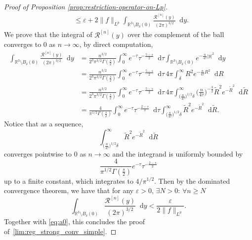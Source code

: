 \documentclass[12pt,a4paper]{amsart}
\numberwithin{equation}{section}
\newcommand*\diff{\mathop{}\!\mathrm{d}}
\begin{document}
\begin{proof}[Proof of Proposition \ref{prop:restriction-operator-on-Lp}]
\begin{align}
			&\leq  \varepsilon + 2 \| f \|_{L^p} \int_{\mathbb{R}^3\setminus B_\delta(0)} \frac{\mathcal{R}^{[n]}(y)}{(2 \pi)^{3/2} } \diff y. \label{eq:a0}
		\end{align}
		We prove that the integral of $\mathcal{R}^{[n]}(y)$ over the complement of the ball converges to 0 as $ n \rightarrow  \infty $, by direct computation,
		\begin{align}
			\int_{\mathbb{R}^3\setminus B_\delta(0)}  \frac{\mathcal{R}^{[n]}(y)}{(2 \pi)^{3/2} } \diff y & =  \frac{n^{3/2}}{2^{3} \pi^{3/2} \Gamma(\frac{s}{2})} \int_{0}^{\infty} e^{-\tau} \tau^{-\frac{5-s}{2}}  \diff \tau  \int_{\mathbb{R}^3\setminus B_\delta(0)}  e^{-\frac{n}{4 \tau} |y|^2}  \diff y \\
			& =  \frac{n^{3/2}}{2^{3} \pi^{3/2} \Gamma(\frac{s}{2})} \int_{0}^{\infty}  e^{-\tau} \tau^{-\frac{5-s}{2}} \diff \tau \, 4 \pi \int_{\delta}^{\infty}  R^2 e^{-\frac{n}{4 \tau} R^2} \diff R \\
			& =  \frac{n^{3/2}}{2^{3} \pi^{3/2} \Gamma(\frac{s}{2})} \int_{0}^{\infty}  e^{-\tau} \tau^{-\frac{5-s}{2}} \diff \tau\, 4 \pi \int_{ \big( \frac{n}{4 \tau} \big)^{1/2} \delta}^{\infty} \Big( \frac{n}{4 \tau} \Big)^{-\frac{3}{2}} \tilde{R}^2 e^{-\tilde{R}^2}  \diff \tilde{R} \\
			& =  \frac{4}{ \pi^{1/2} \Gamma(\frac{s}{2})} \int_{0}^{\infty}  e^{-\tau} \tau^{-\frac{2-s}{2}} \diff \tau\int_{ \big( \frac{n}{4 \tau} \big)^{1/2} \delta}^{\infty}  \tilde{R}^2 e^{-\tilde{R}^2}\diff \tilde{R} .
		\end{align}
		Notice that as a sequence, 
		\begin{equation}
			\int_{ \big( \frac{n}{4 \tau} \big)^{1/2} \delta}^{\infty}  \tilde{R}^2 e^{-\tilde{R}^2} \diff \tilde{R}
		\end{equation}
		converges pointwise to $0$ as $ n \rightarrow \infty $ and the integrand is uniformly bounded by
		\begin{equation}
			\frac{4}{\pi^{1/2} \Gamma(\frac{s}{2})} e^{-\tau} \tau^{-\frac{2-s}{2}}
		\end{equation}
		up to a finite constant, which integrates to $ 4/\pi^{1/2} $. Then by the dominated convergence theorem, we have that for any $ \varepsilon >0 $, $ \exists N >0: \, \forall n \geq N $ 
		\begin{equation}
			\int_{\mathbb{R}^3\setminus B_\delta(0)}  \frac{\mathcal{R}^{[n]}(y)}{(2 \pi)^{3/2}} \diff y  < \frac{\varepsilon}{2 \| f \|_{L^p}} .
		\end{equation}
		Together with \eqref{eq:a0}, this concludes the proof of~\eqref{lim:reg_strong_conv_simple}.
	\end{proof}
	
\end{document}

